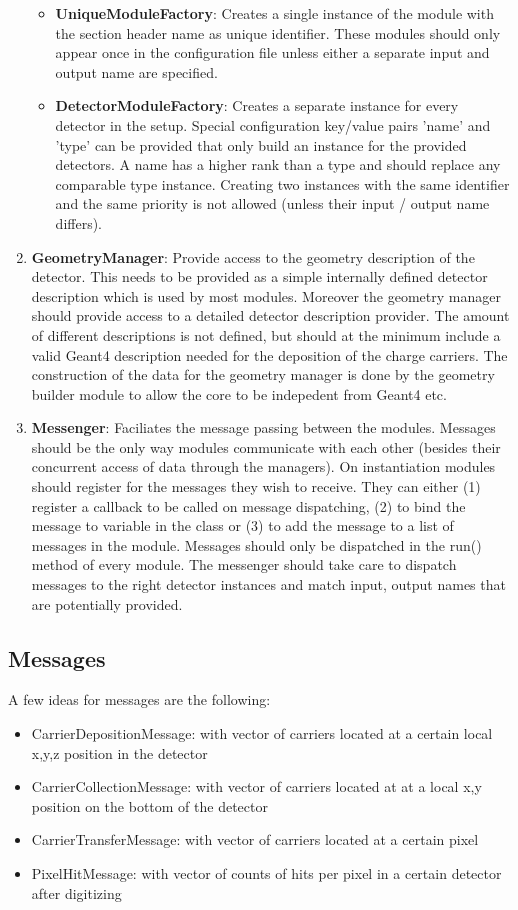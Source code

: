 \begin{enumerate}
\begin{itemize}
\item \textbf{UniqueModuleFactory}: Creates a single instance of the module with the section header name as unique identifier. These modules should only appear once in the configuration file unless either a separate input and output name are specified.
\item \textbf{DetectorModuleFactory}: Creates a separate instance for every detector in the setup. Special configuration key/value pairs 'name' and 'type' can be provided that only build an instance for the provided detectors. A name has a higher rank than a type and should replace any comparable type instance. Creating two instances with the same identifier and the same priority is not allowed (unless their input / output name differs).
\end{itemize}
\item \textbf{GeometryManager}: Provide access to the geometry description of the detector. This needs to be provided as a simple internally defined detector description which is used by most modules. Moreover the geometry manager should provide access to a detailed detector description provider. The amount of different descriptions is not defined, but should at the minimum include a valid Geant4 description needed for the deposition of the charge carriers. The construction of the data for the geometry manager is done by the geometry builder module to allow the core to be indepedent from Geant4 etc.
\item \textbf{Messenger}: Faciliates the message passing between the modules. Messages should be the only way modules communicate with each other (besides their concurrent access of data through the managers). On instantiation modules should register for the messages they wish to receive. They can either (1) register a callback to be called on message dispatching, (2) to bind the message to variable in the class or (3) to add the message to a list of messages in the module. Messages should only be dispatched in the run() method of every module. The messenger should take care to dispatch messages to the right detector instances and match input, output names that are potentially provided.
\end{enumerate}

\subsection{Messages}
A few ideas for messages are the following:
\begin{itemize}
\item CarrierDepositionMessage: with vector of carriers located at a certain local x,y,z position in the detector
\item CarrierCollectionMessage: with vector of carriers located at at a local x,y position on the bottom of the detector
\item CarrierTransferMessage: with vector of carriers located at a certain pixel
\item PixelHitMessage: with vector of counts of hits per pixel in a certain detector after digitizing
\end{itemize}
